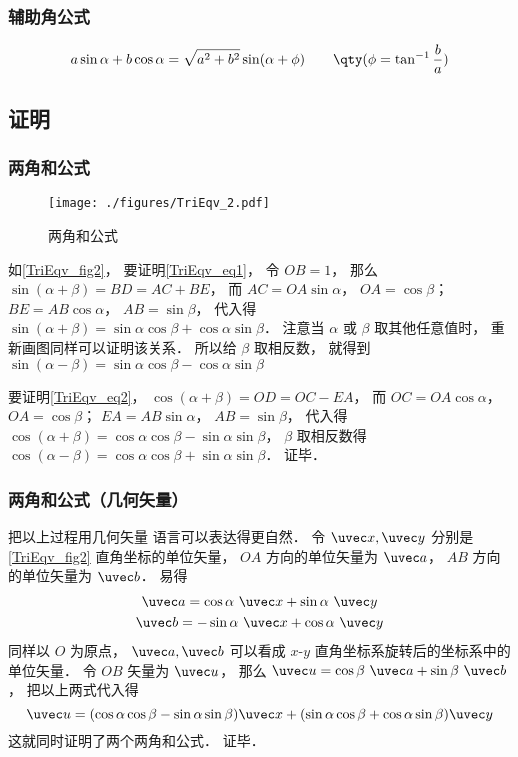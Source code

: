 \subsubsection{辅助角公式}
\begin{equation}
a\sin \alpha + b\cos \alpha = \sqrt{a^2+b^2}\sin(\alpha + \phi) \qquad \qty(\phi = \tan^{-1}\frac{b}{a})
\end{equation}

\subsection{证明}\label{TriEqv_sub1}
\subsubsection{两角和公式}
\begin{figure}[ht]
\centering
\texttt{[image: ./figures/TriEqv\_2.pdf]}
\caption{两角和公式} \label{TriEqv_fig2}
\end{figure}
如\autoref{TriEqv_fig2}， 要证明\autoref{TriEqv_eq1}， 令 $OB = 1$， 那么 $\sin(\alpha+\beta) = BD = AC + BE$， 而 $AC = OA \sin\alpha$， $OA = \cos\beta$； $BE = AB\cos\alpha$， $AB = \sin\beta$， 代入得 $\sin(\alpha+\beta) = \sin\alpha\cos\beta + \cos\alpha\sin\beta$． 注意当 $\alpha$ 或 $\beta$ 取其他任意值时， 重新画图同样可以证明该关系． 所以给 $\beta$ 取相反数， 就得到 $\sin(\alpha-\beta) = \sin\alpha\cos\beta - \cos\alpha\sin\beta$

要证明\autoref{TriEqv_eq2}， $\cos(\alpha+\beta) = OD = OC - EA$， 而 $OC = OA\cos\alpha$， $OA = \cos\beta$； $EA = AB\sin\alpha$， $AB = \sin\beta$， 代入得 $\cos(\alpha+\beta) = \cos\alpha\cos\beta - \sin\alpha\sin\beta$， $\beta$ 取相反数得 $\cos(\alpha-\beta) = \cos\alpha\cos\beta + \sin\alpha\sin\beta$． 证毕．

\subsubsection{两角和公式（几何矢量）}
把以上过程用几何矢量 语言可以表达得更自然． 令 $\uvec x, \uvec y$ 分别是\autoref{TriEqv_fig2} 直角坐标的单位矢量， $OA$ 方向的单位矢量为 $\uvec a$， $AB$ 方向的单位矢量为 $\uvec b$． 易得
\begin{gather}
\uvec a = \cos\alpha\ \uvec x + \sin\alpha\ \uvec y\\
\uvec b = -\sin\alpha\ \uvec x + \cos\alpha\ \uvec y
\end{gather}
同样以 $O$ 为原点， $\uvec a, \uvec b$ 可以看成 $x$-$y$ 直角坐标系旋转后的坐标系中的单位矢量． 令 $OB$ 矢量为 $\uvec u$， 那么 $\uvec u = \cos\beta\ \uvec a + \sin\beta\ \uvec b$， 把以上两式代入得
\begin{equation}
\uvec u = (\cos\alpha\cos\beta - \sin\alpha\sin\beta)\uvec x + (\sin\alpha\cos\beta + \cos\alpha\sin\beta)\uvec y
\end{equation}
这就同时证明了两个两角和公式． 证毕．

